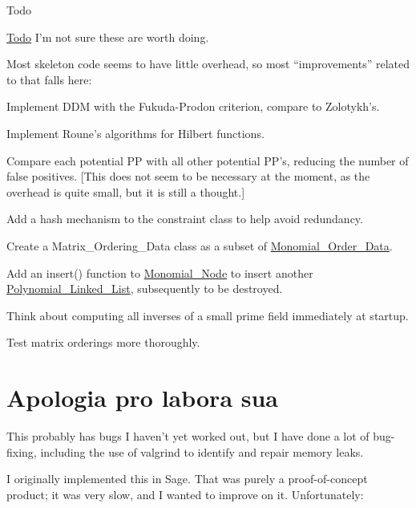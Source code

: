 \begin{DoxyRefDesc}{Todo}
\item[\hyperlink{todo__todo000003}{Todo}]I'm not sure these are worth doing.
\begin{DoxyItemize}
\item Most skeleton code seems to have little overhead, so most ``improvements'' related to that falls here\+:
\begin{DoxyItemize}
\item Implement D\+DM with the Fukuda-\/\+Prodon criterion, compare to Zolotykh's.
\item Implement Roune's algorithms for Hilbert functions.
\item Compare each potential PP with all other potential PP's, reducing the number of false positives. \mbox{[}This does not seem to be necessary at the moment, as the overhead is quite small, but it is still a thought.\mbox{]}
\item Add a hash mechanism to the {\ttfamily constraint} class to help avoid redundancy.
\end{DoxyItemize}
\item Create a Matrix\+\_\+\+Ordering\+\_\+\+Data class as a subset of \hyperlink{group__orderinggroup_class_monomial___order___data}{Monomial\+\_\+\+Order\+\_\+\+Data}.
\item Add an {\ttfamily insert()} function to \hyperlink{group__polygroup_class_monomial___node}{Monomial\+\_\+\+Node} to insert another \hyperlink{group__polygroup_class_polynomial___linked___list}{Polynomial\+\_\+\+Linked\+\_\+\+List}, subsequently to be destroyed.
\item Think about computing all inverses of a small prime field immediately at startup.
\item Test matrix orderings more thoroughly.
\end{DoxyItemize}\end{DoxyRefDesc}
\hypertarget{index_Apologia}{}\section{Apologia pro labora sua}\label{index_Apologia}
This probably has bugs I haven't yet worked out, but I have done a lot of bug-\/fixing, including the use of {\ttfamily valgrind} to identify and repair memory leaks.

I originally implemented this in Sage. That was purely a proof-\/of-\/concept product; it was very slow, and I wanted to improve on it. Unfortunately\+:


